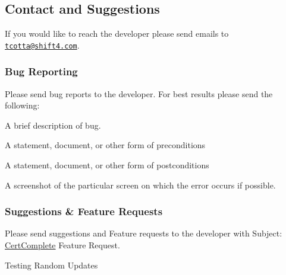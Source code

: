 \subsection*{Contact and Suggestions}

If you would like to reach the developer please send emails to \href{mailto:tcotta@shift4.com}{\tt tcotta@shift4.\+com}.

\subsubsection*{Bug Reporting}

Please send bug reports to the developer. For best results please send the following\+: ~\newline

\begin{DoxyItemize}
\item A brief description of bug.
\item A statement, document, or other form of preconditions
\item A statement, document, or other form of postconditions
\item A screenshot of the particular screen on which the error occurs if possible.
\end{DoxyItemize}

\subsubsection*{Suggestions \& Feature Requests}

Please send suggestions and Feature requests to the developer with Subject\+: \mbox{\hyperlink{namespace_cert_complete}{Cert\+Complete}} Feature Request.

Testing Random Updates 